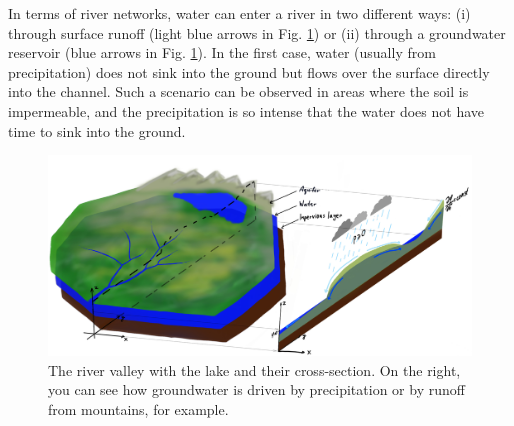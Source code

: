 \documentclass[]{pracamgr}
\begin{document}
    In terms of river networks, water can enter a river in two different ways: (i) through surface runoff (light blue arrows in Fig. \ref{pow_wsiakanie}) or (ii) through a groundwater reservoir (blue arrows in Fig. \ref{pow_wsiakanie}). In the first case, water (usually from precipitation) does not sink into the ground but flows over the surface directly into the channel. Such a scenario can be observed in areas where the soil is impermeable, and the precipitation is so intense that the water does not have time to sink into the ground.

    \begin{figure}[H]
      \centering
      \includegraphics[width=1\textwidth]{figs/basic_river_illustration.jpg}
      \caption{The river valley with the lake and their cross-section. On the right, you can see how groundwater is driven by precipitation or by runoff from mountains, for example.}
      \label{pow_wsiakanie}
    \end{figure}
\end{document}
